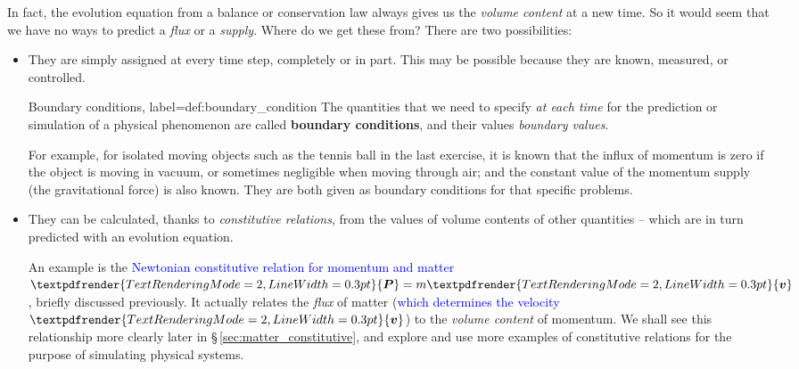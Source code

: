 \documentclass[a4paper,12pt,%
onecolumn,oneside,titlepage,%
british%
]{memoir}
\renewcommand*{\bm}[1]{\textpdfrender{TextRenderingMode=2,LineWidth=0.3pt}{\boldsymbol{#1}}}
\renewcommand*{\|}[1][]{\nonscript\:#1\vert\nonscript\:\mathopen{}}
\newcommand*{\sect}{\S}%
\renewcommand*{\autoref}[2]{\sidepar{\vspace{-1ex}\footnotesize{\color{blue}\faIcon{%
reply%
}\enspace\sect\,\ref{#1} page\,\pageref{#1}}}\textcolor{blue}{#2}}
\newcommand*{\yv}{\bm{v}}
\newcommand*{\yM}{m}%
\newcommand*{\yP}{\bm{P}}
\begin{document}
In fact, the evolution equation from a balance or conservation law always gives us the \emph{volume content} at a new time. So it would seem that we have no ways to predict a \emph{flux} or a \emph{supply}. Where do we get these from? There are two possibilities:
\begin{itemize}[para]
\item They are simply assigned at every time step, completely or in part. This may be possible because they are known, measured, or controlled.
  \begin{definition}{Boundary conditions, label={def:boundary_condition}}
    The quantities that we need to specify \emph{at each time} for the prediction or simulation of a physical phenomenon are called \textbf{boundary conditions}, and their values \emph{boundary values}.
  \end{definition}

  For example, for isolated moving objects such as the tennis ball in the last exercise, it is known that the influx of momentum is zero if the object is moving in vacuum, or sometimes negligible when moving through air; and the constant value of the momentum supply (the gravitational force) is also known. They are both given as boundary conditions for that specific problems.

\item They can be calculated, thanks to \emph{constitutive relations}, from the values of volume contents of other quantities -- which are in turn predicted with an evolution equation.

  An example is the \autoref{item:momentum_mass_velocity}{Newtonian constitutive relation for momentum and matter} $\yP = \yM\yv$, briefly discussed previously. It actually relates the \emph{flux} of matter (\autoref{sec:fluxes_velocities}{which determines the velocity $\yv$}) to the \emph{volume content} of momentum. We shall see this relationship more clearly later in \sect\,\ref{sec:matter_constitutive}, and explore and use more examples of constitutive relations for the purpose of simulating physical systems.
\end{itemize}
\end{document}
